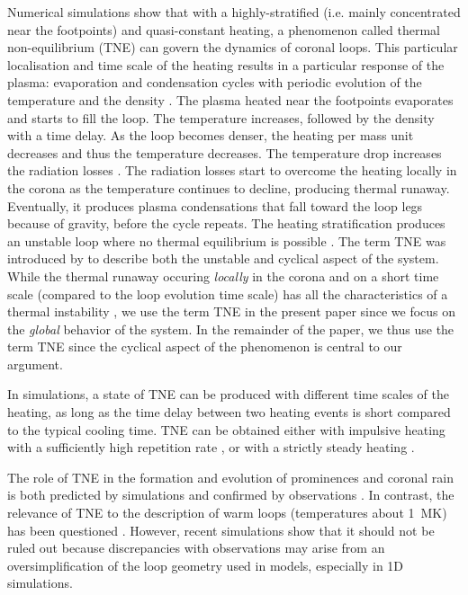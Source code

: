 \documentclass[preprint2]{aastex6}
\begin{document}
Numerical simulations show that with a highly-stratified (i.e. mainly concentrated near the footpoints) and quasi-constant heating, a phenomenon called thermal non-equilibrium (TNE) can govern the dynamics of coronal loops. This particular localisation and time scale of the heating results in a particular response of the plasma: evaporation and condensation cycles with periodic evolution of the temperature and the density \citep[e.g.,][]{kuin1982}. The plasma heated near the footpoints 
evaporates and starts to fill the loop. The temperature increases, followed by the density with a time delay. 
As the loop becomes denser, the heating per mass unit decreases and thus the temperature decreases. The temperature drop increases the radiation losses \citep{rosner1978}. The radiation losses start to overcome the heating locally in the corona as the temperature continues to decline, producing thermal runaway.
Eventually, it produces plasma condensations that fall toward the loop legs because of gravity, before the cycle repeats.
The heating stratification produces an unstable loop where no thermal equilibrium is possible \citep[e.g.,][]{antiochos1999,patsourakos_model_2004,klimchuk2010}. The term TNE was introduced by \citet{karpen_are_2001} to describe both the unstable and cyclical aspect of the system. While the thermal runaway occuring \textit{locally} in the corona and on a short time scale (compared to the loop evolution time scale) has all the characteristics of a thermal instability \citep{parker_instability_1953,field_thermal_1965}, we use the term TNE in the present paper since we focus on the  \textit{global} behavior of the system. In the remainder of the paper, we thus use the term TNE since the cyclical aspect of the phenomenon is central to our argument.

\medskip

In simulations, a state of TNE can be produced with different time scales of the heating, as long as the time delay between two heating events is short compared to the typical cooling time. TNE can be obtained either with impulsive heating with a sufficiently high repetition rate \citep[e.g.,][]{mendoza-briceno2005, karpen2008, susino2010,antolin2010}, or with a strictly steady heating \citep[e.g.,][]{muller2003, muller2004, mok2008, lionello2013, mikic2013, mok2016}. 

The role of TNE in the formation and evolution of prominences \citep{antiochos1991,antiochos1999,antiochos2000, karpen2006, xia_formation_2011,xia_simulating_2014} and coronal rain \citep{muller2003,muller2004,antolin2010, fang2013} is both predicted by simulations and confirmed by observations \citep{schrijver2001, degroof2004, muller2005, antolin2012, vashalomidze2015, antolin2015}. In contrast, the relevance of TNE to the description of warm loops (temperatures about 1~MK) has been questioned \citep{klimchuk2010}. However, recent simulations \citep{lionello2013, mikic2013, winebarger2014, lionello2016, mok2016} show that it should not be ruled out because discrepancies with observations may arise from an oversimplification of the loop geometry used in models, especially in 1D simulations.
\end{document}
